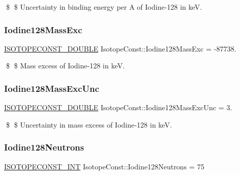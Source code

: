 \$ \$ Uncertainty in binding energy per A of Iodine-\/128 in keV. \mbox{\label{group___isotope_const-_iodine-_i128_ga4995a00567307caa269bcfe7ed7435d7}} 
\subsubsection{\texorpdfstring{Iodine128\+Mass\+Exc}{Iodine128MassExc}}
{\footnotesize\ttfamily \mbox{\hyperlink{group___isotope_const-_macros_ga8f45a7272ce02c0b4c65c44636ed719a}{I\+S\+O\+T\+O\+P\+E\+C\+O\+N\+S\+T\+\_\+\+D\+O\+U\+B\+LE}} Isotope\+Const\+::\+Iodine128\+Mass\+Exc = -\/87738.}

\$ \$ Mass excess of Iodine-\/128 in keV. \mbox{\label{group___isotope_const-_iodine-_i128_ga91d5e8cf6d28e10ca6cc5007e8790d80}} 
\subsubsection{\texorpdfstring{Iodine128\+Mass\+Exc\+Unc}{Iodine128MassExcUnc}}
{\footnotesize\ttfamily \mbox{\hyperlink{group___isotope_const-_macros_ga8f45a7272ce02c0b4c65c44636ed719a}{I\+S\+O\+T\+O\+P\+E\+C\+O\+N\+S\+T\+\_\+\+D\+O\+U\+B\+LE}} Isotope\+Const\+::\+Iodine128\+Mass\+Exc\+Unc = 3.}

\$ \$ Uncertainty in mass excess of Iodine-\/128 in keV. \mbox{\label{group___isotope_const-_iodine-_i128_ga2bcd2a55abafe501f8baddb03d766255}} 
\subsubsection{\texorpdfstring{Iodine128\+Neutrons}{Iodine128Neutrons}}
{\footnotesize\ttfamily \mbox{\hyperlink{group___isotope_const-_macros_ga5f18360b3e99483a35c32d789e62621c}{I\+S\+O\+T\+O\+P\+E\+C\+O\+N\+S\+T\+\_\+\+I\+NT}} Isotope\+Const\+::\+Iodine128\+Neutrons = 75}

